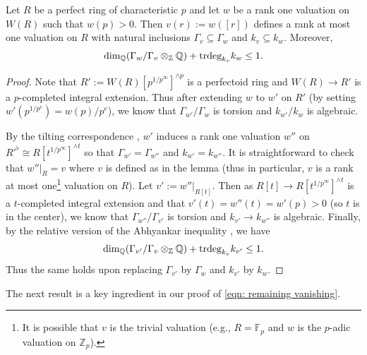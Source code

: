 \documentclass[12pt]{amsart}
\numberwithin{equation}{theorem}
\numberwithin{equation}{theorem}
\newcommand{\trdeg}{\textnormal{trdeg}}
\begin{document}
\begin{lemma}
\label{lem: valuation on W(R)}
Let $R$ be a perfect ring of characteristic $p$ and let $w$ be a rank one valuation on $W(R)$ such that $w(p)>0$. Then $v(r):=w([r])$ defines a rank at most one valuation on $R$ with natural inclusions $\Gamma_v\subseteq \Gamma_w$ and $k_v\subseteq k_w$. Moreover, 
$$\dim_\Q(\Gamma_w/\Gamma_v \otimes_\Z\Q) + \trdeg_{k_v}k_w\leq 1.$$
\end{lemma}
\begin{proof}
Note that $R':=W(R)[p^{1/p^\infty}]^{\wedge p}$ is a perfectoid ring and $W(R)\to R'$ is a $p$-completed integral extension. Thus after extending $w$ to $w'$ on $R'$ (by setting $w'(p^{1/p^e})=w(p)/p^e$), we know that $\Gamma_{w'}/\Gamma_{w}$ is torsion and $k_{w'}/k_w$ is algebraic. 

By the tilting correspondence \cite[Lemma 3.4 (iii)]{ScholzePerfectoidSpaces2012}, $w'$ induces a rank one valuation $w''$ on $R'^{\flat}\cong R[t^{1/p^\infty}]^{\wedge t}$ so that $\Gamma_{w'}=\Gamma_{w''}$ and $k_{w'}=k_{w''}$. It is straightforward to check that $w''|_R=v$ where $v$ is defined as in the lemma (thus in particular, $v$ is a rank at most one\footnote{It is possible that $v$ is the trivial valuation (e.g., $R=\mathbb F_p$ and $w$ is the $p$-adic valuation on $\mathbb Z_p$).} valuation on $R$). Let $v':=w''|_{R[t]}$. Then as $R[t]\to R[t^{1/p^\infty}]^{\wedge t}$ is a $t$-completed integral extension and that $v'(t)=w''(t)=w'(p)>0$ (so $t$ is in the center), we know that $\Gamma_{w''}/\Gamma_{v'}$ is torsion and ${k_{v'}}\to k_{w''}$ is algebraic. Finally, by the relative version of the Abhyankar inequality \cite[VI.10.3,
Corollary 1]{Bourbaki1998}, we have 
$$\dim_\Q(\Gamma_{v'}/\Gamma_v \otimes_\Z\Q) + \trdeg_{k_v}k_{v'}\leq 1.$$
Thus the same holds upon replacing $\Gamma_{v'}$ by $\Gamma_w$ and $k_{v'}$ by $k_w$. %
\end{proof}

The next result is a key ingredient in our proof of \autoref{eqn: remaining vanishing}.
\end{document}
